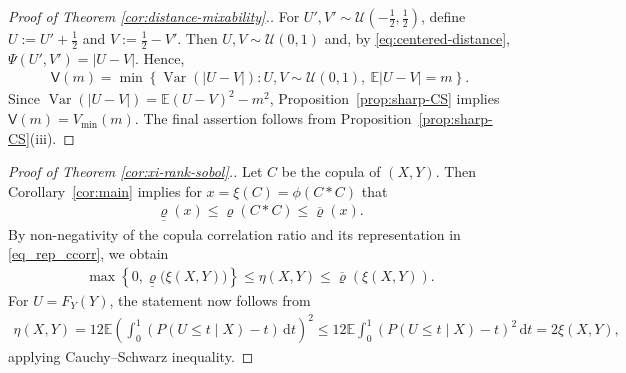 \documentclass{article}
\newcommand{\de}{\mathrm{\,d}}
\newcommand{\brho}{\overline\varrho}
\newcommand{\Var}{\operatorname{Var}}
\newcommand{\E}{\mathbb{E}}
\newcommand{\cU}{\mathcal{U}}
\begin{document}
\begin{proof}[Proof of Theorem \ref{cor:distance-mixability}.]
For \(U',V'\sim\cU(-\tfrac12,\tfrac12)\), define \(U:=U'+\tfrac12\) and \(V:=\tfrac12-V'\).
Then \(U,V\sim\cU(0,1)\) and, by \eqref{eq:centered-distance}, \(\Psi(U',V') = |U-V|. \) Hence,
\begin{align*}
    \mathsf V(m)
    =
    \min\left\{
        \Var(|U-V|):
        U,V\sim\cU(0,1),\
        \E|U-V|=m
    \right\}.
\end{align*}
Since \(\Var(|U-V|) = \E(U-V)^2-m^2\), Proposition~\ref{prop:sharp-CS} implies \(\mathsf V(m) = V_{\operatorname{min}}(m).\) The final assertion follows from Proposition~\ref{prop:sharp-CS}(iii).
\end{proof}



\begin{proof}[Proof of Theorem \ref{cor:xi-rank-sobol}.]
Let \(C\) be the copula of \((X,Y)\).
Then Corollary~\ref{cor:main} implies for \(x = \xi(C) = \phi(C\ast C)\) that
\begin{align*}
    \underline{\varrho}(x) \leq \varrho(C\ast C) \leq \brho(x).
\end{align*}
By non-negativity of the copula correlation ratio and its representation in \eqref{eq_rep_ccorr}, we obtain
\begin{align}\label{eq_cor21eq3}
    \max\!\left\{
        0,\underline{\varrho}\bigl(\xi(X,Y)\bigr)
    \right\}
    \leq
    \eta(X,Y)
    \leq   \brho(\xi(X,Y)).
\end{align}
For \(U = F_Y(Y)\), the statement now follows from
\begin{align*}
    \eta(X,Y) = 12 \E\left(\int_0^1 \left(P(U\leq t \mid X) - t\right) \de t\right)^2 \leq 12 \E \int_0^1 \left(P(U\leq t \mid X) - t \right)^2 \de t = 2 \xi(X,Y),
\end{align*}
applying Cauchy--Schwarz inequality.
\end{proof}
\end{document}
